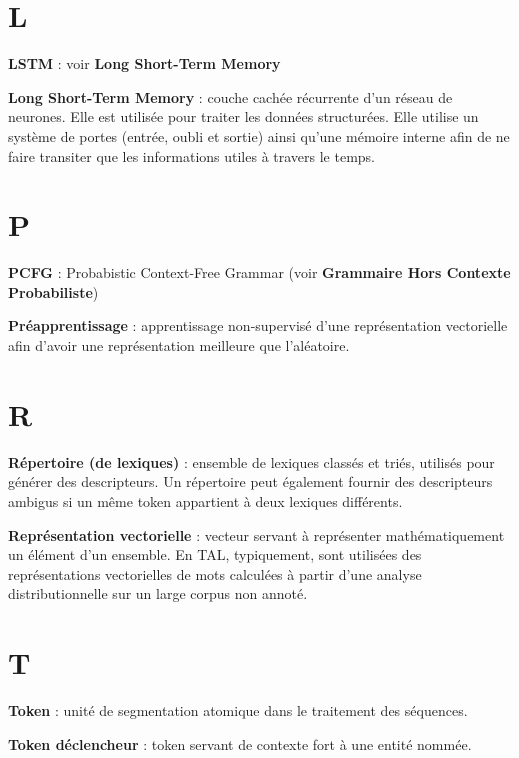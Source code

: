\documentclass[12pt,a4paper,times,twoside,openright]{report}
\begin{document}
\section*{L}
\textbf{LSTM} : voir \textbf{Long Short-Term Memory}

\textbf{Long Short-Term Memory} : couche cachée récurrente d'un réseau de neurones. Elle est utilisée pour traiter les données structurées. Elle utilise un système de portes (entrée, oubli et sortie) ainsi qu'une mémoire interne afin de ne faire transiter que les informations utiles à travers le temps.


\section*{P}
\textbf{PCFG} : Probabistic Context-Free Grammar (voir \textbf{Grammaire Hors Contexte Probabiliste})

\textbf{Préapprentissage} : apprentissage non-supervisé d'une représentation vectorielle afin d'avoir une représentation meilleure que l'aléatoire.

\section*{R}
\textbf{Répertoire (de lexiques)} : ensemble de lexiques classés et triés, utilisés pour générer des descripteurs. Un répertoire peut également fournir des descripteurs ambigus si un même token appartient à deux lexiques différents.

\textbf{Représentation vectorielle} : vecteur servant à représenter mathématiquement un élément d'un ensemble. En TAL, typiquement, sont utilisées des représentations vectorielles de mots calculées à partir d'une analyse distributionnelle sur un large corpus non annoté.

\section*{T}
\textbf{Token} : unité de segmentation atomique dans le traitement des séquences.

\textbf{Token déclencheur} : token servant de contexte fort à une entité nommée.
\end{document}
